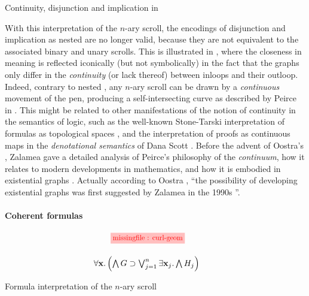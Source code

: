 \begin{marginfigure}
  
  \caption{Continuity, disjunction and implication in }
\end{marginfigure}

With this interpretation of the $n$-ary scroll, the  encodings of
disjunction and implication as nested  are no longer valid, because they are
not  equivalent to the associated binary and unary scrolls.
This is illustrated in , where the closeness in meaning is
reflected iconically (but not symbolically) in the fact that the graphs only
differ in the \emph{continuity} (or lack thereof) between inloops and their
outloop. Indeed, contrary to nested , any $n$-ary scroll can be drawn by a
\emph{continuous} movement of the pen, producing a self-intersecting curve as
described by Peirce in \cite{peirce_prolegomena_1906}. This might be related to
other manifestations of the notion of continuity in the semantics of
 logic, such as the well-known Stone-Tarski interpretation of
formulas as topological spaces \cite{stone_topological_1938}, and the
interpretation of proofs as continuous maps in the \emph{denotational semantics}
of Dana Scott . Before the advent of Oostra's
, Zalamea gave a detailed analysis of Peirce's philosophy of
the \emph{continuum}, how it relates to modern developments in mathematics, and
how it is embodied in existential graphs \cite{zalamea_peirces_2003}. Actually
according to Oostra , ``the
possibility of developing  existential graphs was first suggested
by Zalamea in the 1990s \cite{zalamea_ieg_1,zalamea_ieg_2}''.

\paragraph{Coherent formulas}

\begin{marginfigure}
  $$
  \!\!\!\!
  \!\!\!\!
  \!\!\!\!
  \begin{array}{c}
    \tikzfig{0.85}{0.85}{curl-geom} \vspace{1.5em}\\
    \forall \bx. \left(\bigwedge G \limp \bigvee_{j = 1}^{n}\exists \bx_j. \bigwedge H_j\right)
  \end{array}
  $$
  \caption{Formula interpretation of the $n$-ary scroll}
\end{marginfigure}

